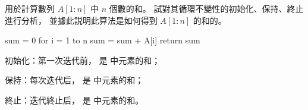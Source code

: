 \startEXERCISE
{} 用於計算數列 $A[1:n]$ 中 $n$ 個數的和。
試對其循環不變性的初始化、保持、終止進行分析，
並據此説明此算法是如何得到 $A[1:n]$ 的和的。

\startCLRSCODE
sum = 0
for i = 1 to n
	sum = sum + A[i]
return sum
\stopCLRSCODE
\stopEXERCISE

\startANSWER
\startigBase
\item 初始化：第一次迭代前，  是  中元素的和；
\item 保持：每次迭代后，  是  中元素的和；
\item 終止：迭代終止后，  是  中元素的和。
\stopigBase
\stopANSWER
